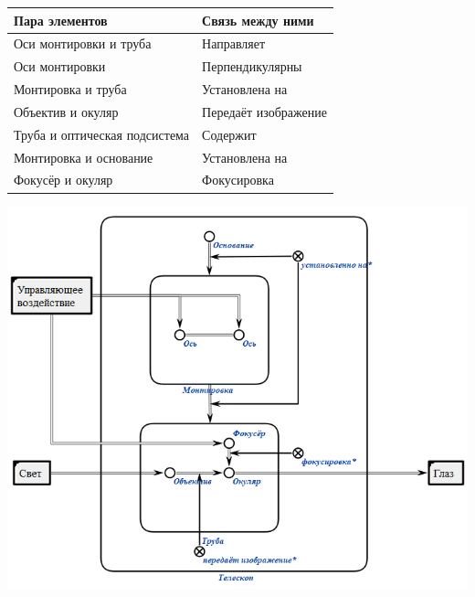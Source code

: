 \begin{center}
\begin{tabular}{ | m{5cm} | m{8cm}| }  
  \hline
  \textbf{Пара элементов}& \textbf{Связь между ними}\\
  \hline
  Оси монтировки и труба& Направляет\\
  \hline
  Оси монтировки& Перпендикулярны\\
  \hline
  Монтировка и труба& Установлена на\\
  \hline
  Объектив и окуляр& Передаёт изображение\\
  \hline
  Труба и оптическая подсистема& Содержит\\
  \hline
  Монтировка и основание& Установлена на\\
  \hline
  Фокусёр и окуляр& Фокусировка\\
  \hline
\end{tabular}

\includegraphics[]{123.png}

\end{center}

